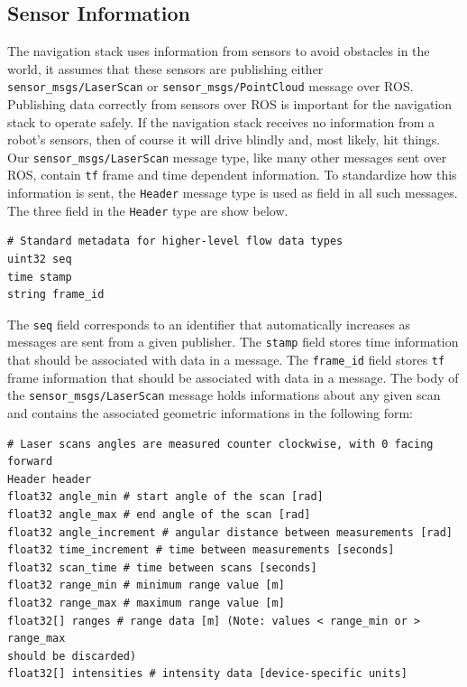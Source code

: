 \subsection*{Sensor Information}
The navigation stack uses information from sensors to avoid obstacles in the world,
it assumes that these sensors are publishing either \texttt{sensor\_msgs/LaserScan}
or \texttt{sensor\_msgs/PointCloud} message over ROS.
Publishing data correctly from sensors over ROS is important for the
navigation stack to operate safely. If the navigation stack receives no information
from a robot’s sensors, then of course it will drive blindly and, most
likely, hit things.
Our \texttt{sensor\_msgs/LaserScan} message type, like many other messages sent 
over ROS, contain \texttt{tf} frame and time dependent information. To standardize 
how this information is sent, the \texttt{Header} message type is used as field
in all such messages.
The three field in the \texttt{Header} type are show below.
\begin{lstlisting}
# Standard metadata for higher-level flow data types
uint32 seq
time stamp
string frame_id
\end{lstlisting}
The \texttt{seq} field corresponds to an identifier that automatically increases
as messages are sent from a given publisher. The \texttt{stamp} field stores time 
information that should be associated with data in a message. The \texttt{frame\_id}
field stores \texttt{tf} frame information that should be associated with data 
in a message. 
The body of the \texttt{sensor\_msgs/LaserScan} message holds informations about 
any given scan and contains the associated geometric informations in the following
form:
\begin{lstlisting}
# Laser scans angles are measured counter clockwise, with 0 facing forward
Header header
float32 angle_min # start angle of the scan [rad]
float32 angle_max # end angle of the scan [rad]
float32 angle_increment # angular distance between measurements [rad]
float32 time_increment # time between measurements [seconds]
float32 scan_time # time between scans [seconds]
float32 range_min # minimum range value [m]
float32 range_max # maximum range value [m]
float32[] ranges # range data [m] (Note: values < range_min or > range_max
should be discarded)
float32[] intensities # intensity data [device-specific units]
\end{lstlisting}


